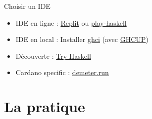 \documentclass[presentation]{beamer}
\begin{document}
\begin{frame}[label={sec:org0af5e88}]{Choisir un IDE}
\begin{block}{}
\end{block}
\begin{block}{}
\begin{itemize}
\item <1-> IDE en ligne : \href{https://replit.com/join/ybqsuyuphr-maliky}{Replit} ou \href{https://play-haskell.tomsmeding.com}{play-haskell}
\item <2-> IDE en local : Installer \href{https://www.haskell.org/downloads/}{ghci} (avec  \href{https://www.haskell.org/ghcup/}{GHCUP})
\item <3-> Découverte :  \href{https://tryhaskell.org/\#step3}{Try Haskell}
\item <4-> Cardano specific :  \href{https://demeter.run/}{demeter.run}
\end{itemize}
\end{block}
\end{frame}
\section{La pratique}
\label{sec:org1bba7b4}
\end{document}
